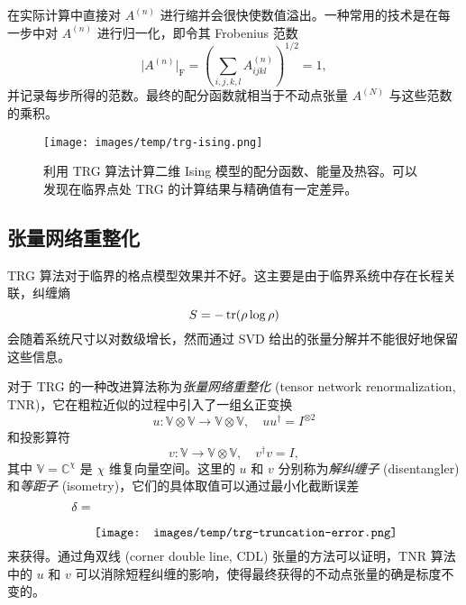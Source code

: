 在实际计算中直接对 $A^{(n)}$ 进行缩并会很快使数值溢出。一种常用的技术是在每一步中对 $A^{(n)}$ 进行归一化，即令其 Frobenius 范数
\begin{equation}
  \bigl| A^{(n)} \bigr|_{\mathrm{F}} = \left( \sum_{i,j,k,l} A^{(n)}_{ijkl} \right)^{1/2} = 1,
\end{equation}
并记录每步所得的范数。最终的配分函数就相当于不动点张量 $A^{(N)}$ 与这些范数的乘积。

\begin{figure}[htb]
  \centering
  \texttt{[image: images/temp/trg-ising.png]}
  \caption{利用 TRG 算法计算二维 Ising 模型的配分函数、能量及热容。可以发现在临界点处 TRG 的计算结果与精确值有一定差异。}
  \label{fig:trg-ising}
\end{figure}

\subsection{张量网络重整化}

TRG 算法对于临界的格点模型效果并不好。这主要是由于临界系统中存在长程关联，纠缠熵
\begin{equation}
  S = -\operatorname{tr}(\rho\log\rho)
\end{equation}
会随着系统尺寸以对数级增长，然而通过 SVD 给出的张量分解并不能很好地保留这些信息。

对于 TRG 的一种改进算法称为\emph{张量网络重整化} (tensor network renormalization, TNR)\cite{evenbly2015tensor1,evenbly2017algorithms}，它在粗粒近似的过程中引入了一组幺正变换
\begin{equation}
  u \colon \mathbb{V} \otimes \mathbb{V} \to \mathbb{V} \otimes \mathbb{V}, \quad
  u u^\dagger = I^{\otimes2}
\end{equation}
和投影算符
\begin{equation}
  v \colon \mathbb{V} \to \mathbb{V} \otimes \mathbb{V}, \quad
  v^\dagger v = I,
\end{equation}
其中 $\mathbb{V}=\mathbb{C}^\chi$ 是 $\chi$ 维复向量空间。这里的 $u$ 和 $v$ 分别称为\emph{解纠缠子} (disentangler) 和\emph{等距子} (isometry)，它们的具体取值可以通过最小化截断误差
\begin{equation}
  \delta = \raisebox{-2em}{\texttt{[image: images/temp/trg-truncation-error.png]}}
\end{equation}
来获得。通过角双线 (corner double line, CDL) 张量的方法可以证明\cite{evenbly2015tensor1}，TNR 算法中的 $u$ 和 $v$ 可以消除短程纠缠的影响，使得最终获得的不动点张量的确是标度不变的。

